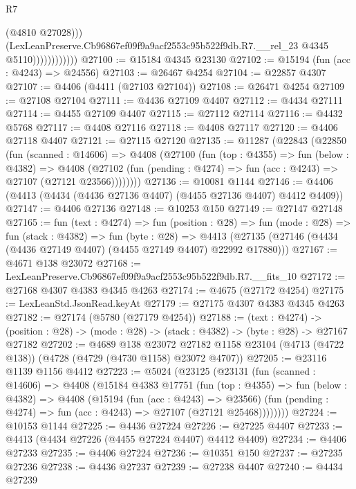 \begin{lexlean}{R7}
\begin{coremodule}
                              (@4810 @27028)))
                          (LexLeanPreserve.Cb96867ef09f9a9acf2553c95b522f9db.R7.__rel_23
                            @4345
                            @5110))))))))))))
@27100 := @15184 @4345 @23130
@27102 := @15194 (fun (acc : @4243) => @24556)
@27103 := @26467 @4254
@27104 := @22857 @4307
@27107 := @4406 (@4411 (@27103 @27104))
@27108 := @26471 @4254
@27109 := @27108 @27104
@27111 := @4436 @27109 @4407
@27112 := @4434 @27111
@27114 := @4455 @27109 @4407
@27115 := @27112 @27114
@27116 := @4432 @5768
@27117 := @4408 @27116
@27118 := @4408 @27117
@27120 := @4406 @27118 @4407
@27121 := @27115 @27120
@27135 := @11287
    (@22843
      (@22850
        (fun (scanned : @14606) =>
        @4408
          (@27100
            (fun (top : @4355) =>
            fun (below : @4382) =>
            @4408
              (@27102 (fun (pending : @4274) => fun (acc : @4243) => @27107 (@27121 @23566))))))))
@27136 := @10081 @1144
@27146 := @4406 (@4413 (@4434 (@4436 @27136 @4407) (@4455 @27136 @4407) @4412 @4409))
@27147 := @4406 @27136
@27148 := @10253 @150
@27149 := @27147 @27148
@27165 := fun (text : @4274) =>
  fun (position : @28) =>
  fun (mode : @28) =>
  fun (stack : @4382) =>
  fun (byte : @28) =>
  @4413 (@27135 (@27146 (@4434 (@4436 @27149 @4407) (@4455 @27149 @4407) @22992 @17880)))
@27167 := @4671 @138 @23072
@27168 := LexLeanPreserve.Cb96867ef09f9a9acf2553c95b522f9db.R7.__fits_10
@27172 := @27168 @4307 @4383 @4345 @4263
@27174 := @4675 (@27172 @4254)
@27175 := LexLeanStd.JsonRead.keyAt
@27179 := @27175 @4307 @4383 @4345 @4263
@27182 := @27174 (@5780 (@27179 @4254))
@27188 := (text : @4274) ->
  (position : @28) -> (mode : @28) -> (stack : @4382) -> (byte : @28) -> @27167 @27182
@27202 := @4689
    @138
    @23072
    @27182
    @1158
    @23104
    (@4713 (@4722 @138))
    (@4728 (@4729 (@4730 @1158) @23072 @4707))
@27205 := @23116 @1139 @1156 @4412
@27223 := @5024
    (@23125
      (@23131
        (fun (scanned : @14606) =>
        @4408
          (@15184
            @4383
            @17751
            (fun (top : @4355) =>
            fun (below : @4382) =>
            @4408
              (@15194
                (fun (acc : @4243) => @23566)
                (fun (pending : @4274) => fun (acc : @4243) => @27107 (@27121 @25468))))))))
@27224 := @10153 @1144
@27225 := @4436 @27224
@27226 := @27225 @4407
@27233 := @4413 (@4434 @27226 (@4455 @27224 @4407) @4412 @4409)
@27234 := @4406 @27233
@27235 := @4406 @27224
@27236 := @10351 @150
@27237 := @27235 @27236
@27238 := @4436 @27237
@27239 := @27238 @4407
@27240 := @4434 @27239

\end{coremodule}
\end{lexlean}
